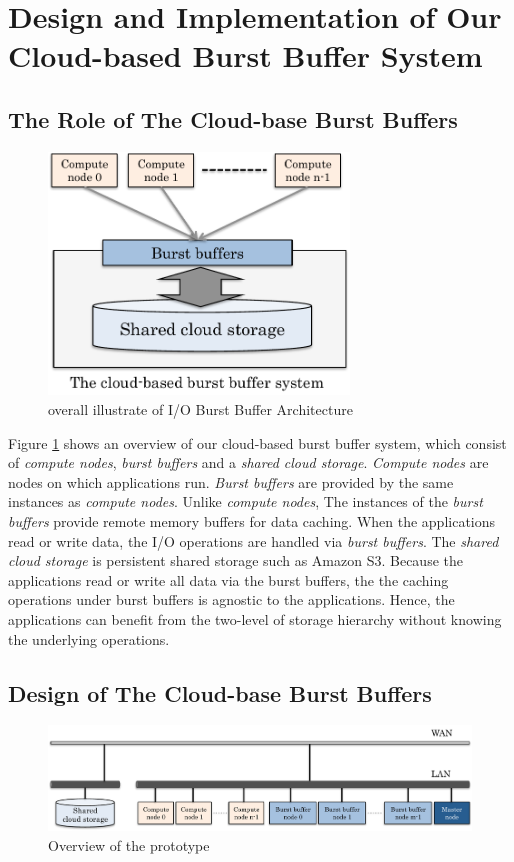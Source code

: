 \section{Design and Implementation of Our Cloud-based Burst Buffer System}
\label{sec:implementation}

\subsection{The Role of The Cloud-base Burst Buffers}
\begin{figure}[tb]
	\centering
	\includegraphics[width=8cm]{img/architecture_overview-2}
	\caption{overall illustrate of I/O Burst Buffer Architecture}
	\label{architecture:overview}
\end{figure}

Figure \ref{architecture:overview} shows an overview of our cloud-based
burst buffer system, which consist of \emph{compute nodes}, \emph{burst buffers}
and a \emph{shared cloud storage}. \emph{Compute nodes} are nodes on which
applications run. \emph{Burst buffers} are provided by the same instances
as \emph{compute nodes}. Unlike \emph{compute nodes}, The instances
of the \emph{burst buffers} provide remote memory buffers for data caching.
When the applications read or write data, the I/O operations are handled via
\emph{burst buffers}.  The \emph{shared cloud storage} is persistent shared storage such as Amazon S3.
Because the applications read or write all data via the burst buffers, the
the caching operations under burst buffers is agnostic to the applications.
Hence, the applications can benefit from the two-level of storage hierarchy
without knowing the underlying operations.

\subsection{Design of The Cloud-base Burst Buffers}
\begin{figure}
\centering
\includegraphics[width=16cm]{img/prototype_overview-2}
\caption{Overview of the prototype}
\label{implemetation:overview of prototype}
\end{figure}

